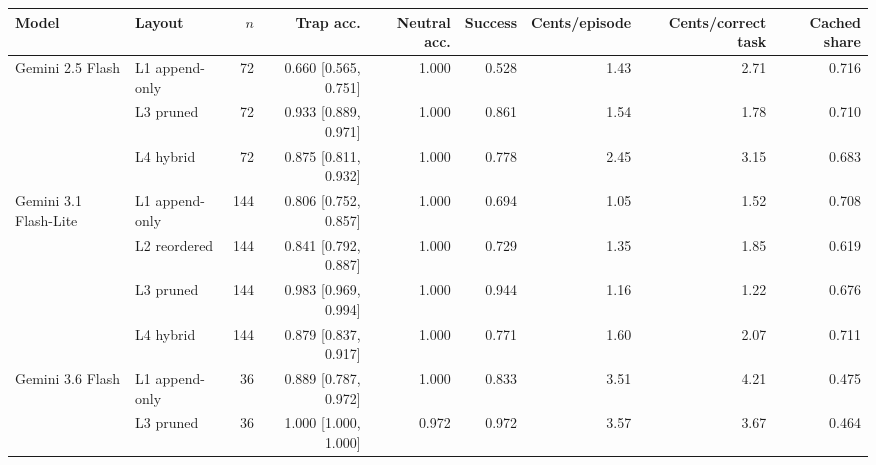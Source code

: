 \begin{tabular}{llrrrrrrr}
\toprule
\textbf{Model} & \textbf{Layout} & $n$ & \textbf{Trap acc.} & \textbf{Neutral acc.} & \textbf{Success} & \textbf{Cents/episode} & \textbf{Cents/correct task} & \textbf{Cached share} \\
\midrule
Gemini 2.5 Flash & L1 append-only & 72 & 0.660 [0.565, 0.751] & 1.000 & 0.528 & 1.43 & 2.71 & 0.716 \\
 & L3 pruned & 72 & 0.933 [0.889, 0.971] & 1.000 & 0.861 & 1.54 & 1.78 & 0.710 \\
 & L4 hybrid & 72 & 0.875 [0.811, 0.932] & 1.000 & 0.778 & 2.45 & 3.15 & 0.683 \\
\midrule
Gemini 3.1 Flash-Lite & L1 append-only & 144 & 0.806 [0.752, 0.857] & 1.000 & 0.694 & 1.05 & 1.52 & 0.708 \\
 & L2 reordered & 144 & 0.841 [0.792, 0.887] & 1.000 & 0.729 & 1.35 & 1.85 & 0.619 \\
 & L3 pruned & 144 & 0.983 [0.969, 0.994] & 1.000 & 0.944 & 1.16 & 1.22 & 0.676 \\
 & L4 hybrid & 144 & 0.879 [0.837, 0.917] & 1.000 & 0.771 & 1.60 & 2.07 & 0.711 \\
\midrule
Gemini 3.6 Flash & L1 append-only & 36 & 0.889 [0.787, 0.972] & 1.000 & 0.833 & 3.51 & 4.21 & 0.475 \\
 & L3 pruned & 36 & 1.000 [1.000, 1.000] & 0.972 & 0.972 & 3.57 & 3.67 & 0.464 \\
\bottomrule
\end{tabular}
